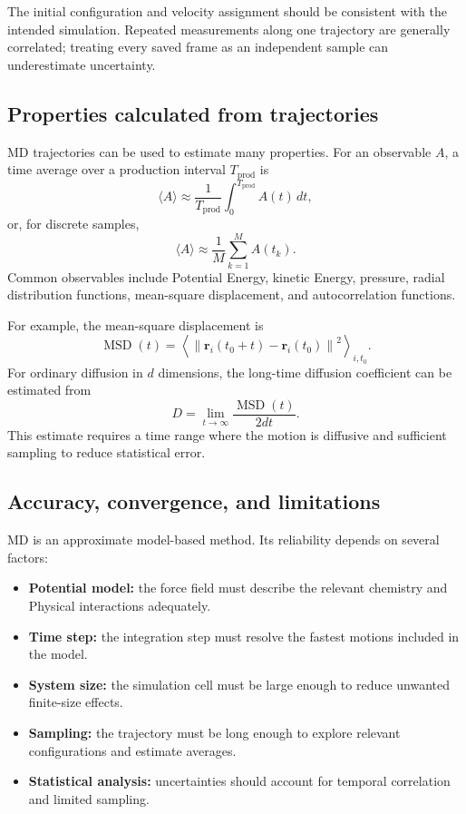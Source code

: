 \documentclass[a4paper, 10pt, onepage]{elegantbook}
\begin{document}
{The initial configuration and velocity assignment should be consistent
with the intended simulation. Repeated measurements along one trajectory
are generally correlated; treating every saved frame as an independent
sample can underestimate uncertainty.

\subsection{Properties calculated from trajectories}

MD trajectories can be used to estimate many properties. For an observable
\(A\), a time average over a production interval \(T_{\mathrm{prod}}\) is
\[
\langle A\rangle
\approx
\frac{1}{T_{\mathrm{prod}}}
\int_0^{T_{\mathrm{prod}}} A(t)\,dt,
\]
or, for discrete samples,
\[
\langle A\rangle
\approx
\frac{1}{M}\sum_{k=1}^{M} A(t_k).
\]
Common observables include Potential Energy, kinetic Energy, pressure,
radial distribution functions, mean-square displacement, and
autocorrelation functions.

For example, the mean-square displacement is
\[
\operatorname{MSD}(t)
=
\left\langle
\left\lVert\bm{r}_i(t_0+t)-\bm{r}_i(t_0)\right\rVert^2
\right\rangle_{i,t_0}.
\]
For ordinary diffusion in \(d\) dimensions, the long-time diffusion
coefficient can be estimated from
\[
D = \lim_{t\to\infty}\frac{\operatorname{MSD}(t)}{2dt}.
\]
This estimate requires a time range where the motion is diffusive and
sufficient sampling to reduce statistical error.

\subsection{Accuracy, convergence, and limitations}

MD is an approximate model-based method. Its reliability depends on several
factors:
\begin{itemize}
  \item \textbf{Potential model:} the force field must describe the relevant
        chemistry and Physical interactions adequately.
  \item \textbf{Time step:} the integration step must resolve the fastest
        motions included in the model.
  \item \textbf{System size:} the simulation cell must be large enough to
        reduce unwanted finite-size effects.
  \item \textbf{Sampling:} the trajectory must be long enough to explore
        relevant configurations and estimate averages.
  \item \textbf{Statistical analysis:} uncertainties should account for
        temporal correlation and limited sampling.
\end{itemize}

}
\end{document}
